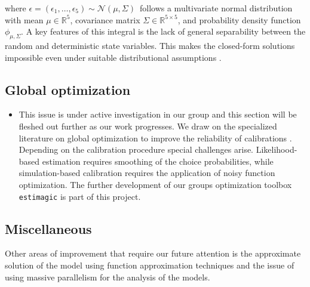 \noindent where $\epsilon = (\epsilon_1, \dots, \epsilon_5) \sim \mathcal{N}(\mu, \Sigma)\,$ follows a multivariate normal distribution with mean $\mu \in \mathbb{R}^{5}$, covariance matrix $ \Sigma \in \mathbb{R}^{5 \times 5}$, and probability density function $\phi_{\mu, \Sigma}$. A key features of this integral is the lack of general separability between the random and deterministic state variables. This makes the closed-form solutions impossible even under suitable distributional assumptions \citep{McFadden.1978,Rust.1987}.
\subsection{Global optimization}
\begin{itemize}
\item This issue is under active investigation in our group and this section will be fleshed out further as our work progresses. We draw on the specialized literature on global optimization to improve the reliability of calibrations \citep{Locatelli.2013}. Depending on the calibration procedure special challenges arise. Likelihood-based estimation requires smoothing of the choice probabilities, while simulation-based calibration requires the application of noisy function optimization. The further development of our groups optimization toolbox \verb+estimagic+ \citep{Gabler.2019} is part of this project.
\end{itemize}
\subsection{Miscellaneous} Other areas of improvement that require our future attention is the approximate solution of the model using function approximation techniques and the issue of using massive parallelism for the analysis of the models.
